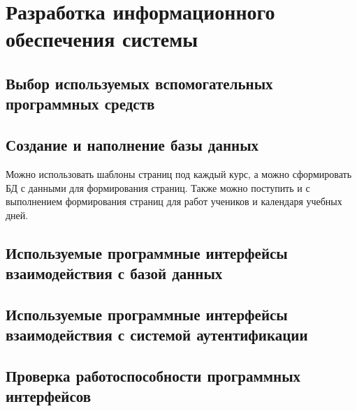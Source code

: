 \section{Разработка информационного обеспечения системы}

\subsection{Выбор используемых вспомогательных программных средств}


\subsection{Создание и наполнение базы данных}





Можно использовать шаблоны страниц под каждый курс, а можно сформировать БД с данными для формирования страниц.
Также можно поступить и с выполнением формирования страниц для работ учеников и календаря учебных дней.


\subsection{Используемые программные интерфейсы взаимодействия с базой данных}



\subsection{Используемые программные интерфейсы взаимодействия с системой аутентификации}

\subsection{Проверка работоспособности программных интерфейсов}


\clearpage
